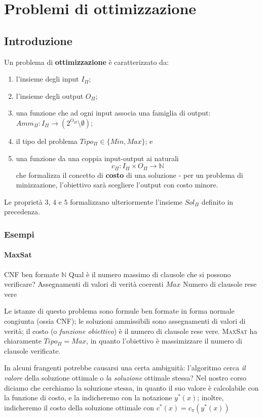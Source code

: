 \chapter{Problemi di ottimizzazione}
\section {Introduzione}
Un problema di \textbf{ottimizzazione} è caratterizzato da: 
\begin{enumerate}
  \item l'insieme degli input $I_{\Pi}$;
  \item l'insieme degli output $O_{\Pi}$;
  \item  una funzione che ad ogni input associa una famiglia di output:
    $Amm_{\Pi} : I_{\Pi} \rightarrow (2^{O_{\Pi}} \setminus \emptyset)$;
  \item il tipo del problema $Tipo_{\Pi} \in \{Min, Max\}$; e
  \item una funzione da una coppia input-output ai naturali
    $$
	c_{\Pi}: I_{\Pi} \times O_{\Pi} \rightarrow \mathbb{N}
    $$
    che formalizza il concetto di \textbf{costo} di una soluzione - per un problema 
    di minizzazione, l'obiettivo sarà scegliere l'output con costo minore. 

\end{enumerate}
Le proprietà $3$, $4$ e $5$ formalizzano ulteriormente l'insieme $Sol_{\Pi}$ definito in precedenza. 
\subsection{Esempi}
\subsubsection{MaxSat}

{CNF ben formate}
{$\mathbb{N}$} 
{Qual è il numero massimo di clausole che si possono verificare?} 
{Assegnamenti di valori di verità coerenti} 
{$Max$}
{Numero di clausole rese vere}

\noindent
Le istanze di questo problema sono formule ben formate in forma normale congiunta
(ossia CNF); le soluzioni ammissibili sono assegnamenti di valori di verità; il
costo (o \textit{funzione obiettivo}) è il numero di clausole rese vere.
\textsc{MaxSat} ha chiaramente $Tipo_{\Pi} = Max$, in quanto l'obiettivo è
massimizzare il numero di clausole verificate.

In alcuni frangenti potrebbe causarsi una certa ambiguità: l'algoritmo cerca
\textit{il valore} della soluzione ottimale o \textit{la soluzione} ottimale
stessa? Nel nostro corso diciamo che cerchiamo la soluzione stessa, in quanto il
suo valore è calcolabile con la funzione di costo, e la indicheremo con la
notazione $y^*(x)$; inoltre, indicheremo il costo della soluzione ottimale con
$c^*(x) = c_{\pi}(y^*(x))$


